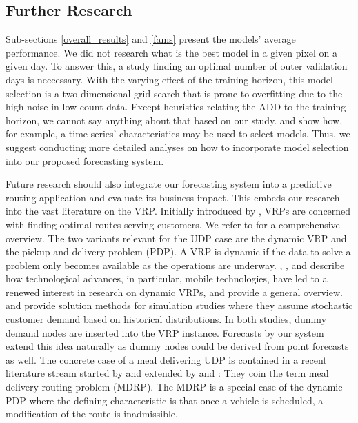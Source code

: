\subsection{Further Research}
\label{further_research}

Sub-sections \ref{overall_results} and \ref{fams} present the models' average
    performance.
We did not research what is the best model in a given pixel on a given day.
To answer this, a study finding an optimal number of outer validation days is
    neccessary.
With the varying effect of the training horizon, this model selection is a
    two-dimensional grid search that is prone to overfitting due to the high
    noise in low count data.
Except heuristics relating the ADD to the training horizon, we cannot say
    anything about that based on our study.
\cite{lemke2010} and \cite{wang2009} show how, for example, a time series'
    characteristics may be used to select models.
Thus, we suggest conducting more detailed analyses on how to incorporate model
    selection into our proposed forecasting system.

Future research should also integrate our forecasting system into a predictive
    routing application and evaluate its business impact.
This embeds our research into the vast literature on the VRP.
Initially introduced by \cite{dantzig1959}, VRPs are concerned with
    finding optimal routes serving customers.
We refer to \cite{toth2014} for a comprehensive overview.
The two variants relevant for the UDP case are the dynamic VRP and
    the pickup and delivery problem (PDP).
A VRP is dynamic if the data to solve a problem only becomes available
    as the operations are underway.
\cite{thomas2010}, \cite{pillac2013}, and \cite{psaraftis2016} describe how
    technological advances, in particular, mobile technologies, have led to a
    renewed interest in research on dynamic VRPs, and
    \cite{berbeglia2010} provide a general overview.
\cite{ichoua2006} and \cite{ferrucci2013} provide solution methods for
    simulation studies where they assume stochastic customer demand based on
    historical distributions.
In both studies, dummy demand nodes are inserted into the VRP instance.
Forecasts by our system extend this idea naturally as dummy nodes could be
    derived from point forecasts as well.
The concrete case of a meal delivering UDP is contained in a recent
    literature stream started by \cite{ulmer2017} and extended by
    \cite{reyes2018} and \cite{yildiz2018}: They coin the term meal delivery
    routing problem (MDRP).
The MDRP is a special case of the dynamic PDP where the defining
    characteristic is that once a vehicle is scheduled, a modification of the
    route is inadmissible.
